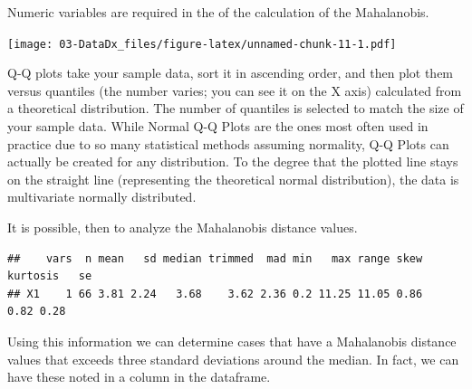 \documentclass[
  11pt,
]{book}
\newenvironment{Shaded}{\begin{snugshade}}{\end{snugshade}}
\newcommand{\FunctionTok}[1]{\textcolor[rgb]{0.27,0.27,0.27}{\textbf{#1}}}
\newcommand{\NormalTok}[1]{#1}
\newcommand{\OtherTok}[1]{\textcolor[rgb]{0.37,0.37,0.37}{#1}}
\newcommand{\SpecialCharTok}[1]{\textcolor[rgb]{0.43,0.43,0.43}{\textbf{#1}}}
\newcommand{\StringTok}[1]{\textcolor[rgb]{0.5,0.5,0.5}{#1}}
\begin{document}
Numeric variables are required in the of the calculation of the Mahalanobis.

\begin{Shaded}
\end{Shaded}

\texttt{[image: 03-DataDx\_files/figure-latex/unnamed-chunk-11-1.pdf]}

Q-Q plots take your sample data, sort it in ascending order, and then plot them versus quantiles (the number varies; you can see it on the X axis) calculated from a theoretical distribution. The number of quantiles is selected to match the size of your sample data. While Normal Q-Q Plots are the ones most often used in practice due to so many statistical methods assuming normality, Q-Q Plots can actually be created for any distribution. To the degree that the plotted line stays on the straight line (representing the theoretical normal distribution), the data is multivariate normally distributed.

It is possible, then to analyze the Mahalanobis distance values.

\begin{Shaded}
\end{Shaded}

\begin{verbatim}
##    vars  n mean   sd median trimmed  mad min   max range skew kurtosis   se
## X1    1 66 3.81 2.24   3.68    3.62 2.36 0.2 11.25 11.05 0.86     0.82 0.28
\end{verbatim}

Using this information we can determine cases that have a Mahalanobis distance values that exceeds three standard deviations around the median. In fact, we can have these noted in a column in the dataframe.
\end{document}
